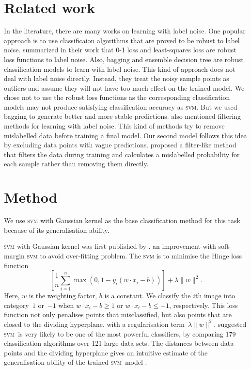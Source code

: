 \documentclass{article} %
\newcommand{\svm}{\textsc{svm}}
\begin{document}
\section{Related work}
In the literature, there are many works on learning with label noise. One popular approach is to use classificaion algorithms that are proved to be robust to label noise. \cite{frenay2014classification} summarized in their work that 0-1 loss and least-squares loss are robust loss functions to label noise. Also, bagging and ensemble decision tree are robust classification models to learn with label noise. This kind of approach does not deal with label noise directly. Instead, they treat the noisy sample points as outliers and assume they will not have too much effect on the trained model. We chose not to use the robust loss functions as the corresponding classification models may not produce satisfying classification accuracy as \textsc{svm}. But we used bagging to generate better and more stable predictions. \cite{frenay2014classification} also mentioned filtering methods for learning with label noise. This kind of methods try to remove mislabelled data before training a final model. Our second model follows this idea by excluding data points with vague predictions. \cite{yang2018adasampling} proposed a filter-like method that filters the data during training and calculates a mislabelled probability for each sample rather than removing them directly. 

\section{Method}
We use \textsc{svm} with Gaussian kernel as the base classification method for this task because of its generalisation ability.

\textsc{svm} with Gaussian kernel was first published by \citet{Boser:1992:TAO:130385.130401}. \citet{Cortes1995} an improvement with soft-margin \textsc{svm} to  avoid over-fitting problem. The \textsc{svm} is to minimise the Hinge loss function
\begin{equation*}
\left[{\frac {1}{n}}\sum _{i=1}^{n}\max \left(0,1-y_{i}(w\cdot x_{i}-b)\right)\right]+\lambda \lVert w\rVert ^{2}.   
\end{equation*}
Here, $w$ is the weighting factor, $b$ is a constant. We classify the $i$th image into category~$1$ or~$-1$ when $w\cdot x_{i}-b\geq1$ or $w\cdot x_{i}-b\leq-1$, respectively. This loss function not only penalises points that misclassified, but also points that are closed to the dividing hyperplane, with a regularisation term~$\lambda \lVert w\rVert ^{2}$. \citet{Fernandez-Delgado:2014:WNH:2627435.2697065} suggested \svm\ is very likely to be one of the most powerful classifiers, by comparing 179 classification algorithms over 121 large data sets. The distances between data points and the dividing hyperplane gives an intuitive estimate of the generalisation ability of the trained \svm\ model \citep{hastie01statisticallearning}. 
\end{document}
